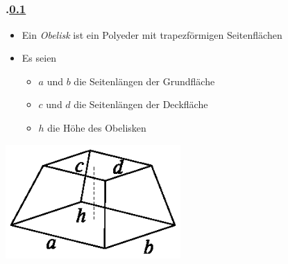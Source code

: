 \subsection{\stitle}\label{S:Beispiel Obelisk}
\begin{frame}[t]%
    \frametitle{\kap.\ref{S:Beispiel Obelisk} \stitle}%

\begin{itemize}
 \item Ein \emph{Obelisk} ist ein Polyeder mit trapezf\"ormigen Seitenfl\"achen
 \item Es seien
 \begin{itemize}
  \item $a$ und $b$ die Seitenl\"angen der Grundfl\"ache
  \item $c$ und $d$ die Seitenl\"angen der Deckfl\"ache
  \item $h$ die H\"ohe des Obelisken
 \end{itemize}
\end{itemize}

\begin{center}
\includegraphics[width=0.5\textwidth]{guterStartInsPraktikum/bilder/obelisk}
\end{center}
\end{frame}


\def\stitle{Hilfsvariablen und Formeln}%
